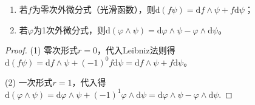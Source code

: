 \documentclass[../../main.tex]{subfiles}%
\begin{document}
\begin{corollary}
\begin{enumerate}[(1)]
\item 若$f$为零次外微分式（光滑函数），则$\mathrm{d}(f\psi)=\mathrm{d}f\wedge\psi+f\mathrm{d}\psi$；
\item 若$\varphi$为1次外微分式，则$\mathrm{d}(\varphi\wedge\psi)=\mathrm{d}\varphi\wedge\psi-\varphi\wedge\mathrm{d}\psi$。
\end{enumerate}
\end{corollary}
\begin{proof}
(1) 零次形式$r=0$，代入Leibniz法则得$\mathrm{d}(f\psi)=\mathrm{d}f\wedge\psi+(-1)^0f\mathrm{d}\psi=\mathrm{d}f\wedge\psi+f\mathrm{d}\psi$。

(2) 一次形式$r=1$，代入得$\mathrm{d}(\varphi\wedge\psi)=\mathrm{d}\varphi\wedge\psi+(-1)^1\varphi\wedge\mathrm{d}\psi=\mathrm{d}\varphi\wedge\psi-\varphi\wedge\mathrm{d}\psi$.
\end{proof}
\end{document}
